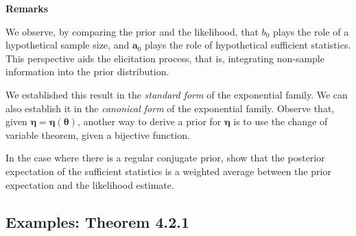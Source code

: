 \textbf{Remarks}

We observe, by comparing the prior and the likelihood, that \( b_0 \) plays the role of a hypothetical sample size, and \( \bm{a}_0 \) plays the role of hypothetical sufficient statistics. This perspective aids the elicitation process, that is, integrating non-sample information into the prior distribution.

We established this result in the \textit{standard form} of the exponential family. We can also establish it in the \textit{canonical form} of the exponential family. Observe that, given \( \bm{\eta} = \bm{\eta}(\bm{\theta}) \), another way to derive a prior for \( \bm{\eta} \) is to use the change of variable theorem, given a bijective function.

In the case where there is a regular conjugate prior, \cite{diaconis1979conjugate} show that the posterior expectation of the sufficient statistics is a weighted average between the prior expectation and the likelihood estimate.

\subsection{Examples: Theorem 4.2.1}\label{sec421}

